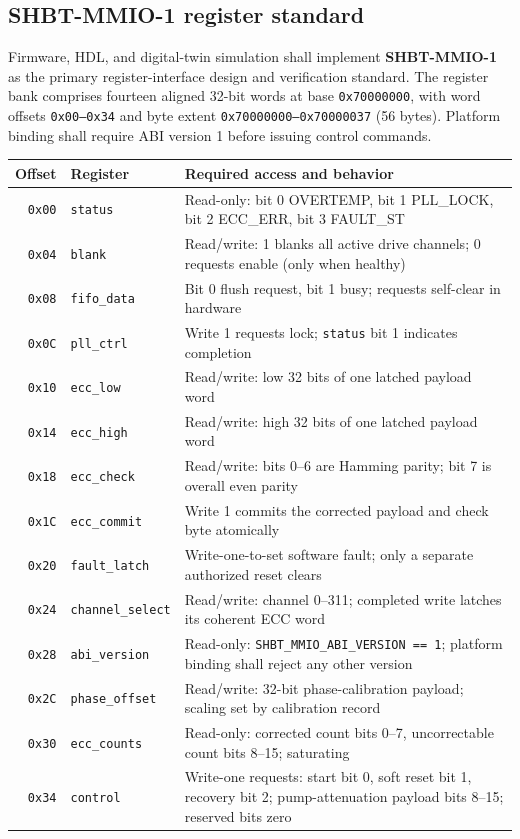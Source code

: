 \documentclass[11pt,a4paper]{article}
\begin{document}
\subsection{SHBT-MMIO-1 register standard}
\label{sec:mmio}
Firmware, HDL, and digital-twin simulation shall implement \textbf{SHBT-MMIO-1}
as the primary register-interface design and verification standard.
The register bank comprises fourteen aligned 32-bit words at base
\texttt{0x70000000}, with word offsets \texttt{0x00--0x34} and byte extent
\texttt{0x70000000--0x70000037} (56 bytes). Platform binding shall require ABI
version 1 before issuing control commands.
\begin{center}\small
\begin{tabular}{@{}rlP{8.9cm}@{}}\toprule
Offset & Register & Required access and behavior\\\midrule
\texttt{0x00} & \texttt{status} & Read-only: bit 0 OVERTEMP, bit 1 PLL\_LOCK, bit 2 ECC\_ERR, bit 3 FAULT\_ST\\
\texttt{0x04} & \texttt{blank} & Read/write: 1 blanks all active drive channels; 0 requests enable (only when healthy)\\
\texttt{0x08} & \texttt{fifo\_data} & Bit 0 flush request, bit 1 busy; requests self-clear in hardware\\
\texttt{0x0C} & \texttt{pll\_ctrl} & Write 1 requests lock; \texttt{status} bit 1 indicates completion\\
\texttt{0x10} & \texttt{ecc\_low} & Read/write: low 32 bits of one latched payload word\\
\texttt{0x14} & \texttt{ecc\_high} & Read/write: high 32 bits of one latched payload word\\
\texttt{0x18} & \texttt{ecc\_check} & Read/write: bits 0--6 are Hamming parity; bit 7 is overall even parity\\
\texttt{0x1C} & \texttt{ecc\_commit} & Write 1 commits the corrected payload and check byte atomically\\
\texttt{0x20} & \texttt{fault\_latch} & Write-one-to-set software fault; only a separate authorized reset clears\\
\texttt{0x24} & \texttt{channel\_select} & Read/write: channel 0--311; completed write latches its coherent ECC word\\
\texttt{0x28} & \texttt{abi\_version} & Read-only: \texttt{SHBT\_MMIO\_ABI\_VERSION == 1}; platform binding shall reject any other version\\
\texttt{0x2C} & \texttt{phase\_offset} & Read/write: 32-bit phase-calibration payload; scaling set by calibration record\\
\texttt{0x30} & \texttt{ecc\_counts} & Read-only: corrected count bits 0--7, uncorrectable count bits 8--15; saturating\\
\texttt{0x34} & \texttt{control} & Write-one requests: start bit 0, soft reset bit 1, recovery bit 2;
pump-attenuation payload bits 8--15; reserved bits zero\\\bottomrule
\end{tabular}\end{center}
\end{document}
